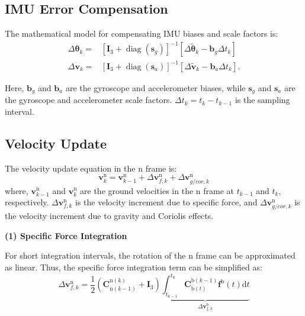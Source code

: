 \documentclass{article}
\begin{document}
\subsection{IMU Error Compensation}

The mathematical model for compensating IMU biases and scale factors is:
\begin{equation}
    \begin{aligned}
        \Delta \boldsymbol{\theta}_{k} =& \left[ \boldsymbol{I}_{3} + \operatorname{diag}(\boldsymbol{s}_{g})\right]^{-1} \left[ \Delta \tilde{\boldsymbol{\theta}}_{k} - \boldsymbol{b}_{g} \Delta t_{k}\right] \\
        \Delta \boldsymbol{v}_{k} =& \left[ \boldsymbol{I}_{3} + \operatorname{diag}(\boldsymbol{s}_{a})\right]^{-1} \left[ \Delta \tilde{\boldsymbol{v}}_{k} - \boldsymbol{b}_{a} \Delta t_{k} \right].
    \end{aligned}
    \label{eq:imu-compensation-equation}
\end{equation}

Here, $\boldsymbol{b}_{g}$ and $\boldsymbol{b}_{a}$ are the gyroscope and accelerometer biases, while $\boldsymbol{s}_{g}$ and $\boldsymbol{s}_{a}$ are the gyroscope and accelerometer scale factors. $\Delta t_k = t_k - t_{k-1}$ is the sampling interval.

\subsection{Velocity Update}

The velocity update equation in the $\mathrm{n}$ frame is:
\begin{equation}
    \boldsymbol{v}_{k}^{\mathrm{n}} = \boldsymbol{v}_{k-1}^{\mathrm{n}} + \Delta \boldsymbol{v}_{f,k}^{\mathrm{n}} + \Delta \boldsymbol{v}_{g/cor,k}^{\mathrm{n}}
    \label{eq:n-velocity-update-equation}
\end{equation}
where, $\boldsymbol{v}_{k-1}^{\mathrm{n}}$ and $\boldsymbol{v}_{k}^{\mathrm{n}}$ are the ground velocities in the $\mathrm{n}$ frame at $t_{k-1}$ and $t_k$, respectively. $\Delta \boldsymbol{v}_{f,k}^{\mathrm{n}}$ is the velocity increment due to specific force, and $\Delta \boldsymbol{v}_{g/cor,k}^{\mathrm{n}}$ is the velocity increment due to gravity and Coriolis effects.

\textbf{(1) Specific Force Integration}

For short integration intervals, the rotation of the $\mathrm{n}$ frame can be approximated as linear. Thus, the specific force integration term can be simplified as:
\begin{equation}
    \Delta \boldsymbol{v}_{f,k}^{\mathrm{n}} = \frac{1}{2}\left( \mathbf{C}_{\mathrm{n}(k-1)}^{\mathrm{n}(k)} + \boldsymbol{I}_{3} \right) \underbrace{\int_{{t_{k-1}}}^{{t_k}} \mathbf{C}_{\mathrm{b}(t)}^{\mathrm{b}(k-1)} \boldsymbol{f}^{\mathrm{b}} \left( {t} \right)\text{d}{t}}_{\Delta \boldsymbol{v}_{f,k}^{\mathrm{b}}}
    \label{eq:n-frame-velocity-integration}
\end{equation}
\end{document}

